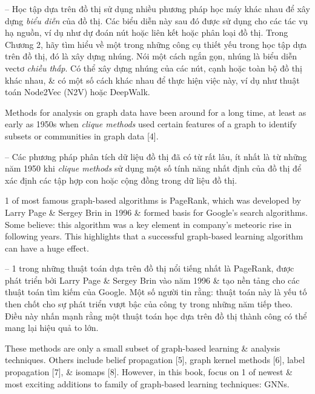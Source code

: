 \documentclass{article}
\begin{document}
\begin{itemize}
\begin{itemize}
\begin{itemize}
            -- Học tập dựa trên đồ thị sử dụng nhiều phương pháp học máy khác nhau để xây dựng {\it biểu diễn} của đồ thị. Các biểu diễn này sau đó được sử dụng cho các tác vụ hạ nguồn, ví dụ như dự đoán nút hoặc liên kết hoặc phân loại đồ thị. Trong Chương 2, hãy tìm hiểu về một trong những công cụ thiết yếu trong học tập dựa trên đồ thị, đó là xây dựng nhúng. Nói một cách ngắn gọn, nhúng là biểu diễn vectơ {\it chiều thấp}. Có thể xây dựng nhúng của các nút, cạnh hoặc toàn bộ đồ thị khác nhau, \& có một số cách khác nhau để thực hiện việc này, ví dụ như thuật toán Node2Vec (N2V) hoặc DeepWalk.

            Methods for analysis on graph data have been around for a long time, at least as early as 1950s when {\it clique methods} used certain features of a graph to identify subsets or communities in graph data [4].

            -- Các phương pháp phân tích dữ liệu đồ thị đã có từ rất lâu, ít nhất là từ những năm 1950 khi {\it clique methods} sử dụng một số tính năng nhất định của đồ thị để xác định các tập hợp con hoặc cộng đồng trong dữ liệu đồ thị.

            1 of most famous graph-based algorithms is PageRank, which was developed by {\sc Larry Page \& Sergey Brin} in 1996 \& formed basis for Google's search algorithms. Some believe: this algorithm was a key element in company's meteoric rise in following years. This highlights that a successful graph-based learning algorithm can have a huge effect.

            -- 1 trong những thuật toán dựa trên đồ thị nổi tiếng nhất là PageRank, được phát triển bởi Larry Page \& Sergey Brin vào năm 1996 \& tạo nền tảng cho các thuật toán tìm kiếm của Google. Một số người tin rằng: thuật toán này là yếu tố then chốt cho sự phát triển vượt bậc của công ty trong những năm tiếp theo. Điều này nhấn mạnh rằng một thuật toán học dựa trên đồ thị thành công có thể mang lại hiệu quả to lớn.

            These methods are only a small subset of graph-based learning \& analysis techniques. Others include belief propagation [5], graph kernel methods [6], label propagation [7], \& isomaps [8]. However, in this book, focus on 1 of newest \& most exciting additions to family of graph-based learning techniques: GNNs.


\end{itemize}
\end{itemize}
\end{itemize}
\end{document}
